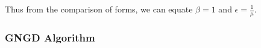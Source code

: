 \documentclass[./main.tex]{subfiles}
\begin{document}
Thus from the comparison of forms, we can equate $ \beta = 1 $ and $ \epsilon = \frac{1}{\mu} $.

\subsubsection{GNGD Algorithm}




%  	


 		
         
 		
\end{document}
